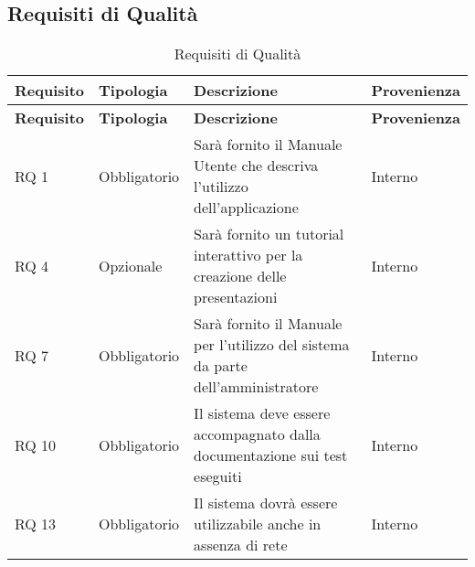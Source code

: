 \subsection{Requisiti di Qualità}{ 
\renewcommand*{\arraystretch}{1.4} 
\begin{longtable} [c]{| p{2.5cm} | p{2.5cm} | p{6cm} |p{2.5cm}|} 
\caption{Requisiti di Qualità \label{tab:reqQualita}}\\ \hline\textbf{Requisito} & \textbf{Tipologia} & \textbf{Descrizione} & \textbf{Provenienza} \\ 
\hline \endfirsthead \hline 
\textbf{Requisito} & \textbf{Tipologia} & \textbf{Descrizione} & \textbf{Provenienza} \\ 
\hline \endhead \hline \endfoot \hline \endlastfoot 
RQ 1 & Obbligatorio & Sarà fornito il Manuale Utente che descriva l'utilizzo dell'applicazione & Interno\\ 
 \hline 
RQ 4 & Opzionale & Sarà fornito un tutorial interattivo per la creazione delle presentazioni & Interno\\ 
 \hline 
RQ 7 & Obbligatorio & Sarà fornito il Manuale per l'utilizzo del sistema da parte dell'amministratore & Interno\\ 
 \hline 
RQ 10 & Obbligatorio & Il sistema deve essere accompagnato dalla documentazione sui test eseguiti & Interno\\ 
 \hline 
RQ 13 & Obbligatorio & Il sistema dovrà essere utilizzabile anche in assenza di rete & Interno\\ 
 \hline 
\end{longtable}}